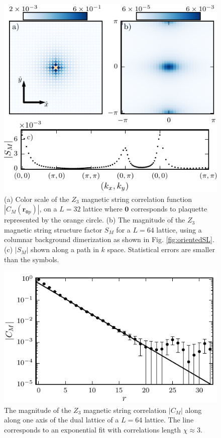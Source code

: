 \documentclass[twocolumn,prb,aps,floatfix,superscriptaddress]{revtex4-1}
\newcommand{\figref}[1]{Fig. \ref{#1}}
\begin{document}
    \begin{figure}[t]
        \centering
        \includegraphics[width=1.0\columnwidth]{vison_3way.pdf}
        \caption
        {
            (a) Color scale of the $Z_3$ magnetic string correlation function $|C_M(\bm{r}_{\bm{0}p})|$,
            on a $L=32$ lattice where $\bm{0}$ corresponds to plaquette represented by the orange circle.
            (b) The magnitude of the $Z_3$ magnetic string structure factor $S_M$ for a $L=64$ lattice, using a columnar background dimerization as shown in \figref{fig:orientedSL}.             
            (c) $|S_M|$ shown along a path in $k$ space. Statistical errors are smaller than the symbols.
        }
        \label{fig:vison_3way}
    \end{figure}

\begin{figure}
    \centering
    \includegraphics[width=1.0\columnwidth]{spatial_cors_z3_vis.pdf}
    \caption{ The magnitude of the $Z_3$ magnetic string correlation $|C_M|$ along along one axis of the dual lattice of a $L=64$ lattice. The line corresponds to an exponential fit with correlations length $\chi\approx 3$.}
    \label{fig:vison_cor}
\end{figure}
\end{document}

